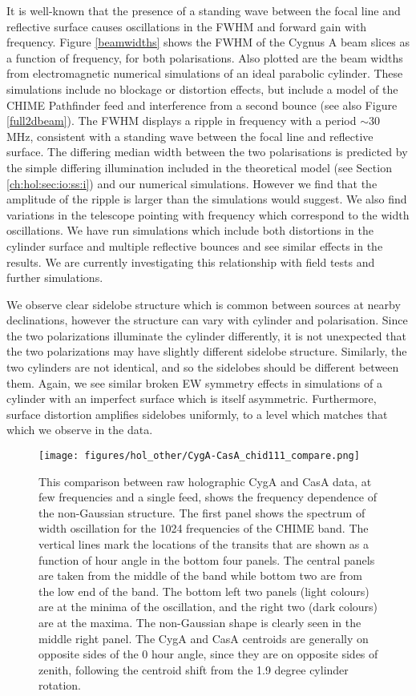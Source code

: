 It is well-known \citep{wander1, wander2} that the presence of a standing wave between the focal line and reflective surface causes oscillations in the FWHM and forward gain with frequency. Figure \ref{beamwidths} shows the FWHM of the Cygnus A beam slices as a function of frequency, for both polarisations. Also plotted are the beam widths from electromagnetic numerical simulations of an ideal parabolic cylinder. These simulations include no blockage or distortion effects, but include a model of the CHIME Pathfinder feed \citep{meiling} and interference from a second bounce (see also Figure \ref{full2dbeam}). The FWHM displays a ripple in frequency with a period $\sim$30 MHz, consistent with a standing wave between the focal line and reflective surface. The differing median width between the two polarisations is predicted by the simple differing illumination included in the theoretical model (see Section \ref{ch:hol:sec:io:ss:i}) and our numerical simulations. However we find that the amplitude of the ripple is larger than the simulations would suggest. We also find variations in the telescope pointing with frequency which correspond to the width oscillations. We have run simulations which include both distortions in the cylinder surface and multiple reflective bounces and see similar effects in the results. We are currently investigating this relationship with field tests and further simulations.

We observe clear sidelobe structure which is common between sources at nearby declinations, however the structure can vary with cylinder and polarisation. Since the two polarizations illuminate the cylinder differently, it is not unexpected that the two polarizations may have slightly different sidelobe structure. Similarly, the two cylinders are not identical, and so the sidelobes should be different between them. Again, we see similar broken EW symmetry effects in simulations of a cylinder with an imperfect surface which is itself asymmetric. Furthermore, surface distortion amplifies sidelobes uniformly, to a level which matches that which we observe in the data.

\begin{figure}[t]
\texttt{[image: figures/hol\_other/CygA-CasA\_chid111\_compare.png]}
\caption{This comparison between raw holographic CygA and CasA data, at few frequencies and a single feed, shows the frequency dependence of the non-Gaussian structure. The first panel shows the spectrum of width oscillation for the 1024 frequencies of the CHIME band. The vertical lines mark the locations of the transits that are shown as a function of hour angle in the bottom four panels. The central panels are taken from the middle of the band while bottom two are from the low end of the band. The bottom left two panels (light colours) are at the minima of the oscillation, and the right two (dark colours) are at the maxima. The non-Gaussian shape is clearly seen in the middle right panel. The CygA and CasA centroids are generally on opposite sides of the 0 hour angle, since they are on opposite sides of zenith, following the centroid shift from the 1.9 degree cylinder rotation.}
\label{cygacasa}
\end{figure} 

